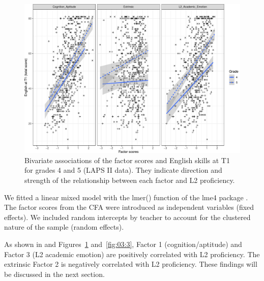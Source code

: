 \documentclass[output=paper]{langsci/langscibook}
\begin{document}
  
\begin{figure}
\includegraphics[width=\textwidth]{figures/Figure3.2.pdf}
\caption{\label{fig:03:2}Bivariate associations of the factor scores and English skills at T1 for grades 4 and 5 (LAPS II data). They indicate direction and strength of the relationship between each factor and L2 proficiency.}
\end{figure}

We fitted a linear mixed model with the lmer() function of the lme4 package \citep{BatesEtAl2015}. The factor scores from the CFA were introduced as independent variables (fixed effects). We included random intercepts by teacher to account for the clustered nature of the sample (random effects). 

As shown in  and Figures~\ref{fig:03:2} and~\ref{fig:03:3}, Factor 1 (cognition/aptitude) and Factor 3 (L2 academic emotion) are positively correlated with L2 proficiency. The extrinsic Factor 2 is negatively correlated with L2 proficiency. These findings will be discussed in the next section. 


\begin{table}
\caption{\label{tab:03:3}Summary of the regression model of the factor scores on English proficiency at T1}
\end{table}
  
\end{document}
